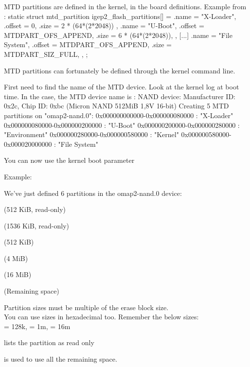   MTD partitions are defined in the kernel, in the board
  definitions. Example from
  :
\starttyping
static struct mtd_partition igep2_flash_partitions[] = {
    {
        .name   = "X-Loader",
        .offset = 0,
        .size   = 2 * (64*(2*2048))
    },
    {
        .name   = "U-Boot",
        .offset = MTDPART_OFS_APPEND,
        .size   = 6 * (64*(2*2048)),
    },
    [...]
    {
        .name   = "File System",
        .offset = MTDPART_OFS_APPEND,
        .size   = MTDPART_SIZ_FULL,
    },
};
\stoptyping

  \startitemize
  \item MTD partitions can fortunately be defined through the kernel
    command line.
  \item First need to find the name of the MTD device. Look at the
    kernel log at boot time. In the case, the MTD device name is
    :
\stopitemize
\starttyping
NAND device: Manufacturer ID: 0x2c, Chip ID: 0xbc (Micron NAND 512MiB 1,8V 16-bit)
Creating 5 MTD partitions on "omap2-nand.0":
0x000000000000-0x000000080000 : "X-Loader"
0x000000080000-0x000000200000 : "U-Boot"
0x000000200000-0x000000280000 : "Environment"
0x000000280000-0x000000580000 : "Kernel"
0x000000580000-0x000020000000 : "File System"
\stoptyping

  \startitemize
  \item You can now use the  kernel boot parameter
  \item Example:\\
  \item We've just defined 6 partitions in the omap2-nand.0 device:
    \startitemize
    \item {} (512 KiB, read-only)
    \item {} (1536 KiB, read-only)
    \item {} (512 KiB)
    \item {} (4 MiB)
    \item {} (16 MiB)
    \item {} (Remaining space)
    \stopitemize
  \stopitemize

  \startitemize
  \item Partition sizes must be multiple of the erase block size.\\
    You can use sizes in hexadecimal too. Remember the below sizes:\\
     = 128k,  = 1m,  = 16m
  \item {} lists the partition as read only
  \item \type{-} is used to use all the remaining space.
  \stopitemize

